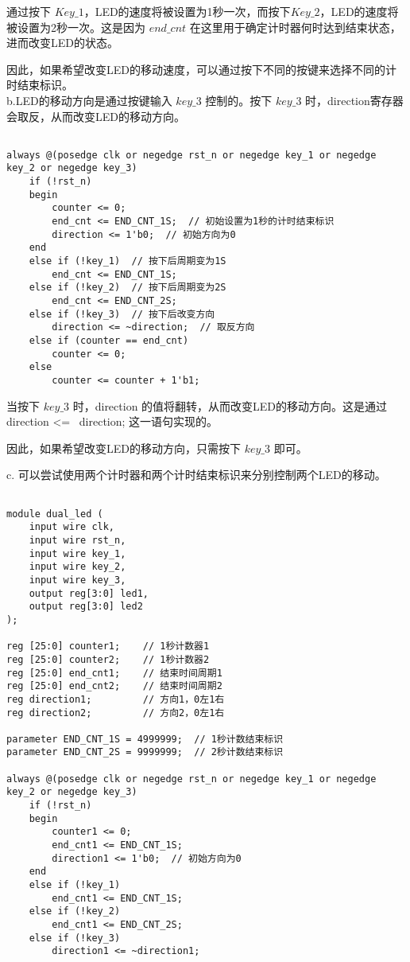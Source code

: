\documentclass[12pt, a4paper, oneside]{article}
\begin{document}
\begin{spacing}{2.0}
\begin{lstlisting}
\end{lstlisting}

通过按下 $Key\_1$，LED的速度将被设置为1秒一次，而按下$Key\_2$，LED的速度将被设置为2秒一次。这是因为 $end\_cnt$ 在这里用于确定计时器何时达到结束状态，进而改变LED的状态。

因此，如果希望改变LED的移动速度，可以通过按下不同的按键来选择不同的计时结束标识。\\

b.LED的移动方向是通过按键输入 $key\_3$ 控制的。按下 $key\_3$ 时，direction寄存器会取反，从而改变LED的移动方向。

\begin{lstlisting}

always @(posedge clk or negedge rst_n or negedge key_1 or negedge key_2 or negedge key_3)
    if (!rst_n)
    begin
        counter <= 0;
        end_cnt <= END_CNT_1S;  // 初始设置为1秒的计时结束标识
        direction <= 1'b0;  // 初始方向为0
    end
    else if (!key_1)  // 按下后周期变为1S
        end_cnt <= END_CNT_1S;
    else if (!key_2)  // 按下后周期变为2S
        end_cnt <= END_CNT_2S;
    else if (!key_3)  // 按下后改变方向
        direction <= ~direction;  // 取反方向
    else if (counter == end_cnt)
        counter <= 0;
    else 
        counter <= counter + 1'b1;

\end{lstlisting}
当按下 $key\_3$ 时，direction 的值将翻转，从而改变LED的移动方向。这是通过 direction <= ~direction; 这一语句实现的。

因此，如果希望改变LED的移动方向，只需按下 $key\_3$ 即可。

c.
可以尝试使用两个计时器和两个计时结束标识来分别控制两个LED的移动。
\begin{lstlisting}

module dual_led (
    input wire clk,
    input wire rst_n,
    input wire key_1,
    input wire key_2,
    input wire key_3,
    output reg[3:0] led1,
    output reg[3:0] led2
);

reg [25:0] counter1;    // 1秒计数器1
reg [25:0] counter2;    // 1秒计数器2
reg [25:0] end_cnt1;    // 结束时间周期1
reg [25:0] end_cnt2;    // 结束时间周期2
reg direction1;         // 方向1，0左1右
reg direction2;         // 方向2，0左1右

parameter END_CNT_1S = 4999999;  // 1秒计数结束标识
parameter END_CNT_2S = 9999999;  // 2秒计数结束标识

always @(posedge clk or negedge rst_n or negedge key_1 or negedge key_2 or negedge key_3)
    if (!rst_n)
    begin
        counter1 <= 0;
        end_cnt1 <= END_CNT_1S;
        direction1 <= 1'b0;  // 初始方向为0
    end
    else if (!key_1)
        end_cnt1 <= END_CNT_1S;
    else if (!key_2)
        end_cnt1 <= END_CNT_2S;
    else if (!key_3)
        direction1 <= ~direction1;


\end{lstlisting}
\end{spacing}
\end{document}
